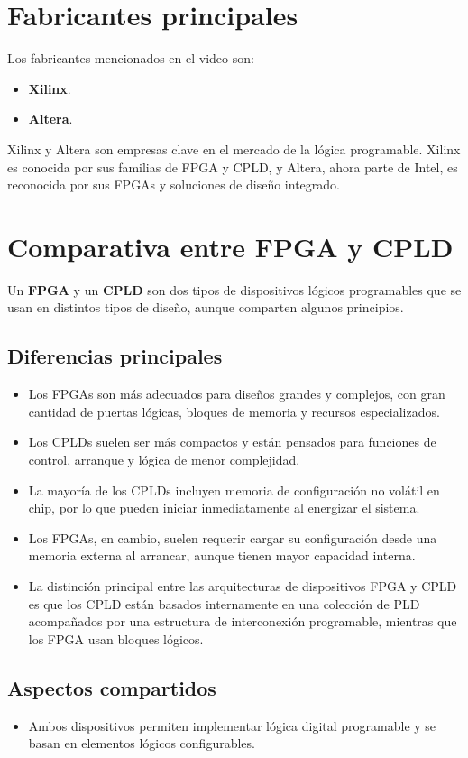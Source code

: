 \documentclass{article}
\theoremstyle{mytheoremstyle}
\theoremstyle{mytheoremstyle}
\theoremstyle{myproblemstyle}
\begin{document}
\section{Fabricantes principales}
Los fabricantes mencionados en el video son:
\begin{itemize}
    \item \textbf{Xilinx}.
    \item \textbf{Altera}.
\end{itemize}
Xilinx y Altera son empresas clave en el mercado de la lógica programable. Xilinx es conocida por
sus familias de FPGA y CPLD, y Altera, ahora parte de Intel, es reconocida por sus FPGAs y soluciones
de diseño integrado.

\section{Comparativa entre FPGA y CPLD}
Un \textbf{FPGA} y un \textbf{CPLD} son dos tipos de dispositivos lógicos programables que se usan
en distintos tipos de diseño, aunque comparten algunos principios.

\subsection*{Diferencias principales}
\begin{itemize}
    \item Los FPGAs son más adecuados para diseños grandes y complejos, con gran cantidad de puertas lógicas, bloques de memoria y recursos especializados.
    \item Los CPLDs suelen ser más compactos y están pensados para funciones de control, arranque y lógica de menor complejidad.
    \item La mayoría de los CPLDs incluyen memoria de configuración no volátil en chip, por lo que pueden iniciar inmediatamente al energizar el sistema.
    \item Los FPGAs, en cambio, suelen requerir cargar su configuración desde una memoria externa al arrancar, aunque tienen mayor capacidad interna.
    \item La distinción principal entre las arquitecturas de dispositivos FPGA y CPLD es que los CPLD están basados internamente en una colección de PLD acompañados por una estructura de interconexión programable, mientras que los FPGA usan bloques lógicos.
\end{itemize}

\subsection*{Aspectos compartidos}
\begin{itemize}
    \item Ambos dispositivos permiten implementar lógica digital programable y se basan en elementos lógicos configurables.
\end{itemize}
\end{document}
